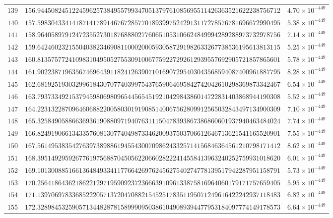 \documentclass[12pt,reqno]{amsart}
\theoremstyle{remark}
\begin{document}
\begin{longtable}{clc}
$139$ & $156.9445082451224596257384955799347051379761085695511426363521622238756712$ & $4.70\times 10^{-449}$ \\
$140$ & $157.5983043341418714178914676728577018939975242913117278576781696672990495$ & $5.38\times 10^{-449}$ \\
$141$ & $158.9640589791247235527301876888027760651053106624849994289288973732978756$ & $7.14\times 10^{-449}$ \\
$142$ & $159.6424602321550403823469081100020005930587291982633267738536195613813115$ & $5.25\times 10^{-449}$ \\
$143$ & $160.8135757724109831049505275530910067759227292612939557692905721857865601$ & $5.78\times 10^{-449}$ \\
$144$ & $161.9022387196356746964391182412639071016907295403043568594087400961887795$ & $8.28\times 10^{-449}$ \\
$145$ & $162.6819251930329961843070774039975437659064695842742042610298369873342467$ & $6.54\times 10^{-449}$ \\
$146$ & $163.7937334921537945980698096544565451921042984386014722831403868944190308$ & $5.52\times 10^{-449}$ \\
$147$ & $164.2231322870964606882200580301919085140067562809912565032843497134900309$ & $7.10\times 10^{-449}$ \\
$148$ & $165.3258490588663693619088097194076311150478393867386860601937940463484024$ & $7.74\times 10^{-449}$ \\
$149$ & $166.8249190661343357608130774049873346200937503706612646713621541165520901$ & $7.55\times 10^{-449}$ \\
$150$ & $167.5614953835427639738988619455430070986243325714156846364561210798171412$ & $8.62\times 10^{-449}$ \\
$151$ & $168.3951492959267761975688704505622066028222414558413963240252759931018620$ & $6.01\times 10^{-449}$ \\
$152$ & $169.1013008851661364849334117766426976245627540274778139517942287951158791$ & $5.73\times 10^{-449}$ \\
$153$ & $170.2564186436218622129719590923723666391096133875816964060179171757659405$ & $5.95\times 10^{-449}$ \\
$154$ & $171.1397069783368522205713720470882154525178351195071249616422242937118483$ & $6.82\times 10^{-449}$ \\
$155$ & $172.3289845325905713448287815899909503861049089394477953184097774149178573$ & $6.64\times 10^{-449}$ \\

\end{longtable}
\end{document}
